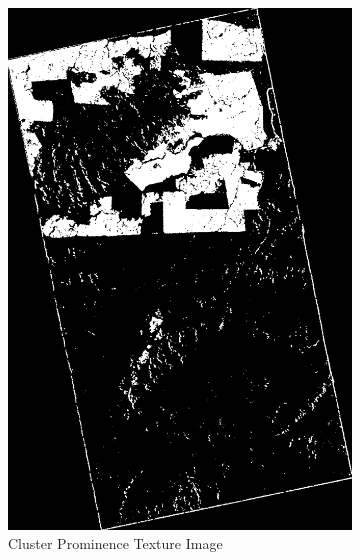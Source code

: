 \begin{figure}[H]
  \centering
  \begin{subfigure}[b]{0.4\linewidth}
    \includegraphics[width=\linewidth]{Chapter4/sum_and_diff_textures/cluster_prominenceimage.png}
     \caption{Cluster Prominence Texture Image}
  \end{subfigure}
  \centering
  \begin{subfigure}[b]{0.4\linewidth}

\end{subfigure}
\end{figure}
